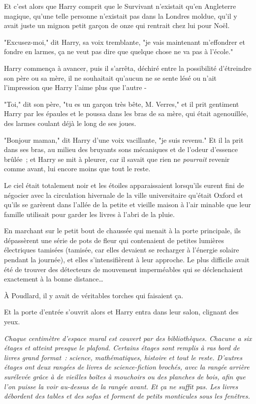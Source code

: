 Et c'est alors que Harry comprit que le Survivant n'existait qu'en Angleterre magique, qu'une telle personne n'existait pas dans la Londres moldue, qu'il y avait juste un mignon petit garçon de onze qui rentrait chez lui pour Noël.

"Excusez-moi," dit Harry, sa voix tremblante, "je vais maintenant m'effondrer et fondre en larmes, ça ne veut pas dire que quelque chose ne va pas à l'école."

Harry commença à avancer, puis il s'arrêta, déchiré entre la possibilité d'étreindre son père ou sa mère, il ne souhaitait qu'aucun ne se sente lésé ou n'ait l'impression que Harry l'aime plus que l'autre -

"Toi," dit son père, "tu es un garçon très bête, M. Verres," et il prit gentiment Harry par les épaules et le poussa dans les bras de sa mère, qui était agenouillée, des larmes coulant déjà le long de ses joues.

"Bonjour maman," dit Harry d'une voix vacillante, "je suis revenu." Et il la prit dans ses bras, au milieu des bruyants sons mécaniques et de l'odeur d'essence brûlée~; et Harry se mit à pleurer, car il savait que rien ne \emph{pourrait} revenir comme avant, lui encore moins que tout le reste.

\later

Le ciel était totalement noir et les étoiles apparaissaient lorsqu'ils eurent fini de négocier avec la circulation hivernale de la ville universitaire qu'était Oxford et qu'ils se garèrent dans l'allée de la petite et vieille maison à l'air minable que leur famille utilisait pour garder les livres à l'abri de la pluie.

En marchant sur le petit bout de chaussée qui menait à la porte principale, ils dépassèrent une série de pots de fleur qui contenaient de petites lumières électriques tamisées (tamisée, car elles devaient se recharger à l'énergie solaire pendant la journée), et elles s'intensifièrent à leur approche. Le plus difficile avait été de trouver des détecteurs de mouvement imperméables qui se déclenchaient exactement à la bonne distance…

À Poudlard, il y avait de véritables torches qui faisaient ça.

Et la porte d'entrée s'ouvrit alors et Harry entra dans leur salon, clignant des yeux.

\emph{Chaque centimètre d'espace mural est couvert par des bibliothèques. Chacune a six étages et atteint presque le plafond. Certains étages sont remplis à ras bord de livres grand format~: science, mathématiques, histoire et tout le reste. D'autres étages ont deux rangées de livres de science-fiction brochés, avec la rangée arrière surélevée grâce à de vieilles boîtes à mouchoirs ou des planches de bois, afin que l'on puisse la voir au-dessus de la rangée avant. Et ça ne suffit pas. Les livres débordent des tables et des sofas et forment de petits monticules sous les fenêtres.}

